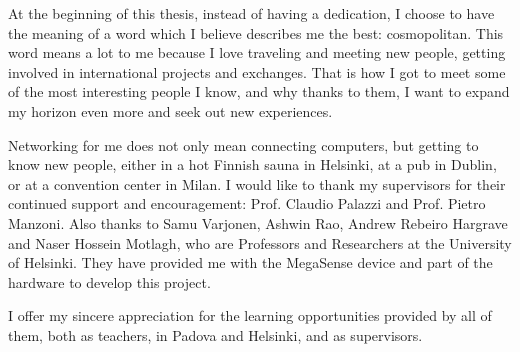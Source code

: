 
At the beginning of this thesis, instead of having a dedication, I choose to have the meaning of a word which I believe describes me the best: cosmopolitan.
This word means a lot to me because I love traveling and meeting new people, getting involved in international projects and exchanges.
That is how I got to meet some of the most interesting people I know, and why thanks to them, I want to expand my horizon even more and seek out new experiences.

Networking for me does not only mean connecting computers, but getting to know new people, either in a hot Finnish sauna in Helsinki, at a pub in Dublin, or at a convention center in Milan.
\newline
\newline
\indent
I would like to thank my supervisors for their continued support and encouragement: Prof. Claudio Palazzi and Prof. Pietro Manzoni.
Also thanks to Samu Varjonen, Ashwin Rao, Andrew Rebeiro Hargrave and ‪Naser Hossein Motlagh‬, who are Professors and Researchers at the University of Helsinki.
They have provided me with the MegaSense device and part of the hardware to develop this project.

I offer my sincere appreciation for the learning opportunities provided by all of them, both as teachers, in Padova and Helsinki, and as supervisors.